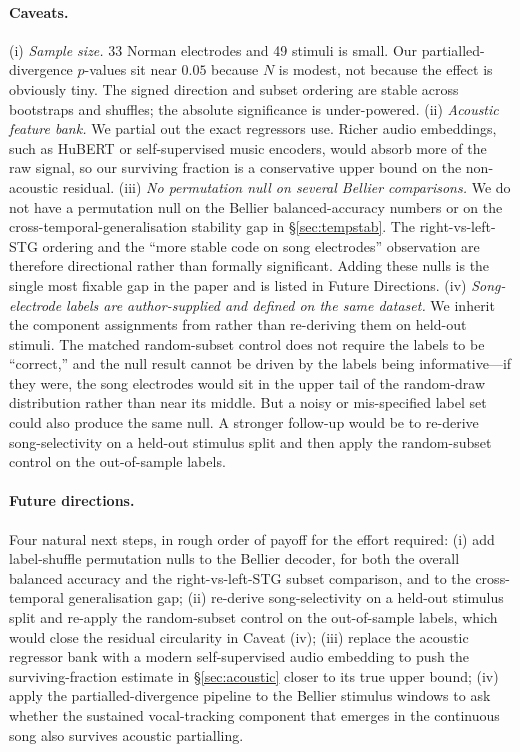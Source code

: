 \documentclass[11pt]{article}
\begin{document}
\paragraph{Caveats.}
(i) \emph{Sample size.} 33 Norman electrodes and 49 stimuli is small. Our partialled-divergence $p$-values sit near $0.05$ because $N$ is modest, not because the effect is obviously tiny. The signed direction and subset ordering are stable across bootstraps and shuffles; the absolute significance is under-powered.
(ii) \emph{Acoustic feature bank.} We partial out the exact regressors \citet{NormanHaignere2022} use. Richer audio embeddings, such as HuBERT or self-supervised music encoders, would absorb more of the raw signal, so our surviving fraction is a conservative upper bound on the non-acoustic residual.
(iii) \emph{No permutation null on several Bellier comparisons.} We do not have a permutation null on the Bellier balanced-accuracy numbers or on the cross-temporal-generalisation stability gap in \S\ref{sec:tempstab}. The right-vs-left-STG ordering and the ``more stable code on song electrodes'' observation are therefore directional rather than formally significant. Adding these nulls is the single most fixable gap in the paper and is listed in Future Directions.
(iv) \emph{Song-electrode labels are author-supplied and defined on the same dataset.} We inherit the component assignments from \citet{NormanHaignere2022} rather than re-deriving them on held-out stimuli. The matched random-subset control does not require the labels to be ``correct,'' and the null result cannot be driven by the labels being informative---if they were, the song electrodes would sit in the upper tail of the random-draw distribution rather than near its middle. But a noisy or mis-specified label set could also produce the same null. A stronger follow-up would be to re-derive song-selectivity on a held-out stimulus split and then apply the random-subset control on the out-of-sample labels.

\paragraph{Future directions.} Four natural next steps, in rough order of payoff for the effort required:
(i) add label-shuffle permutation nulls to the Bellier decoder, for both the overall balanced accuracy and the right-vs-left-STG subset comparison, and to the cross-temporal generalisation gap;
(ii) re-derive song-selectivity on a held-out stimulus split and re-apply the random-subset control on the out-of-sample labels, which would close the residual circularity in Caveat (iv);
(iii) replace the acoustic regressor bank with a modern self-supervised audio embedding to push the surviving-fraction estimate in \S\ref{sec:acoustic} closer to its true upper bound;
(iv) apply the partialled-divergence pipeline to the Bellier stimulus windows to ask whether the sustained vocal-tracking component that emerges in the continuous song also survives acoustic partialling.
\end{document}
